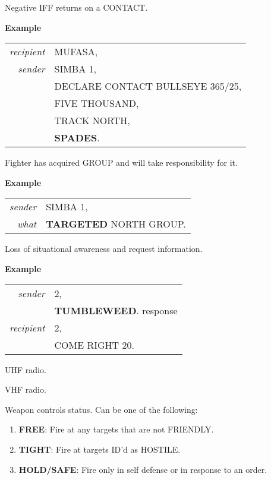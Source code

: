 \begin{tcoloritemize}
    \blueitem[SPADES]
    Negative IFF returns on a CONTACT.

    \medskip
    \textbf{Example}
    \begin{center}
        \begin{tabular}{>{\itshape}r l}
            recipient &  MUFASA, \\
            sender & SIMBA 1, \\
            & DECLARE CONTACT BULLSEYE 365/25, \\
            & FIVE THOUSAND, \\
            & TRACK NORTH, \\
            & \textbf{SPADES}. \\
        \end{tabular}
    \end{center}

    \blueitem[TARGETED]
    Fighter has acquired GROUP and will take responsibility for it.

    \medskip
    \textbf{Example}
    \begin{center}
        \begin{tabular}{>{\itshape}r l}
            sender &  SIMBA 1, \\
            what  & \textbf{TARGETED} NORTH GROUP. \\
        \end{tabular}
    \end{center}

    \blueitem[TUMBLEWEED]
    Loss of situational awareness and request information.

    \medskip
    \textbf{Example}
    \begin{center}
        \begin{tabular}{>{\itshape}r l}
            sender & 2, \\
            & \textbf{TUMBLEWEED}.
            response \\
            recipient & 2, \\
            & COME RIGHT 20. \\
        \end{tabular}
    \end{center}

    \blueitem[UNIFORM]
    UHF radio.

    \blueitem[VICTOR]
    VHF radio.

    Weapon controls status. Can be one of the following:\\
    \begin{enumerate}
        \item \label{FREE} \textbf{FREE}: Fire at any targets that are not FRIENDLY.
        \item \label{TIGHT} \textbf{TIGHT}: Fire at targets ID'd as HOSTILE.
        \item \label{HOLD} \textbf{HOLD/SAFE}: Fire only in self defense or in response to an order.
    \end{enumerate}


\end{tcoloritemize}
